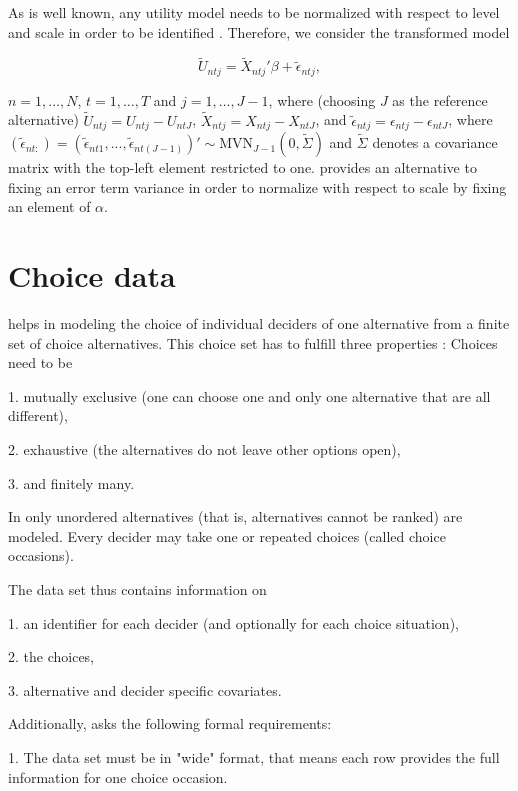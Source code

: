 \documentclass[article]{jss}
\begin{document}
As is well known, any utility model needs to be normalized with respect to level and scale in order to be identified \citep{Train:2009}. Therefore, we consider the transformed model

\begin{equation}
\tilde{U}_{ntj} = \tilde{X}_{ntj}' \beta + \tilde{\epsilon}_{ntj},
\end{equation}

$n=1,\dots,N$, $t=1,\dots,T$ and $j=1,\dots,J-1$, where (choosing $J$ as the reference alternative) $\tilde{U}_{ntj} = U_{ntj} - U_{ntJ}$, $\tilde{X}_{ntj} = X_{ntj} - X_{ntJ}$, and $\tilde{\epsilon}_{ntj} = \epsilon_{ntj} - \epsilon_{ntJ}$, where $(\tilde{\epsilon}_{nt:}) = (\tilde{\epsilon}_{nt1},...,\tilde{\epsilon}_{nt(J-1)})'  \sim \text{MVN}_{J-1} (0,\tilde{\Sigma})$ and $\tilde{\Sigma}$ denotes a covariance matrix with the top-left element restricted to one.  provides an alternative to fixing an error term variance in order to normalize with respect to scale by fixing an element of $\alpha$.

\section{Choice data} \label{sec:choice_data}

 helps in modeling the choice of individual deciders of one alternative from a finite set of choice alternatives. This choice set has to fulfill three properties \citep{Train:2009}: Choices need to be

1. mutually exclusive (one can choose one and only one alternative that are all different),

2. exhaustive (the alternatives do not leave other options open),

3. and finitely many.

In  only unordered alternatives (that is, alternatives cannot be ranked) are modeled. Every decider may take one or repeated choices (called choice occasions).

The data set thus contains information on

1. an identifier for each decider (and optionally for each choice situation),

2. the choices,

3. alternative and decider specific covariates.

Additionally,  asks the following formal requirements:

1. The data set must be in "wide" format, that means each row provides the full information for one choice occasion.
\end{document}
